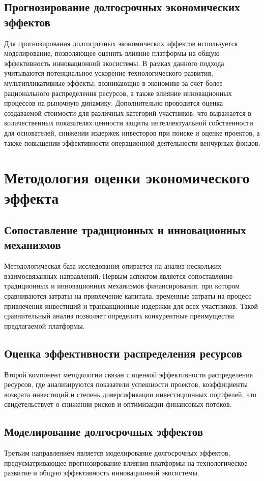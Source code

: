 \documentclass[
    candidate, %
    subf, %
    dotsinheaders=false,
]{disser}
\begin{document}
\subsection{Прогнозирование долгосрочных экономических эффектов}
Для прогнозирования долгосрочных экономических эффектов используется моделирование, позволяющее оценить влияние платформы на общую эффективность инновационной экосистемы. В рамках данного подхода учитываются потенциальное ускорение технологического развития, мультипликативные эффекты, возникающие в экономике за счёт более рационального распределения ресурсов, а также влияние инновационных процессов на рыночную динамику. Дополнительно проводится оценка создаваемой стоимости для различных категорий участников, что выражается в количественных показателях ценности защиты интеллектуальной собственности для основателей, снижении издержек инвесторов при поиске и оценке проектов, а также повышении эффективности операционной деятельности венчурных фондов.

\section{Методология оценки экономического эффекта}

\subsection{Сопоставление традиционных и инновационных механизмов}
Методологическая база исследования опирается на анализ нескольких взаимосвязанных направлений. Первым аспектом является сопоставление традиционных и инновационных механизмов финансирования, при котором сравниваются затраты на привлечение капитала, временные затраты на процесс привлечения инвестиций и транзакционные издержки для всех участников. Такой сравнительный анализ позволяет определить конкурентные преимущества предлагаемой платформы.

\subsection{Оценка эффективности распределения ресурсов}
Второй компонент методологии связан с оценкой эффективности распределения ресурсов, где анализируются показатели успешности проектов, коэффициенты возврата инвестиций и степень диверсификации инвестиционных портфелей, что свидетельствует о снижении рисков и оптимизации финансовых потоков.

\subsection{Моделирование долгосрочных эффектов}
Третьим направлением является моделирование долгосрочных эффектов, предусматривающее прогнозирование влияния платформы на технологическое развитие и общую эффективность инновационной экосистемы.
\end{document}
